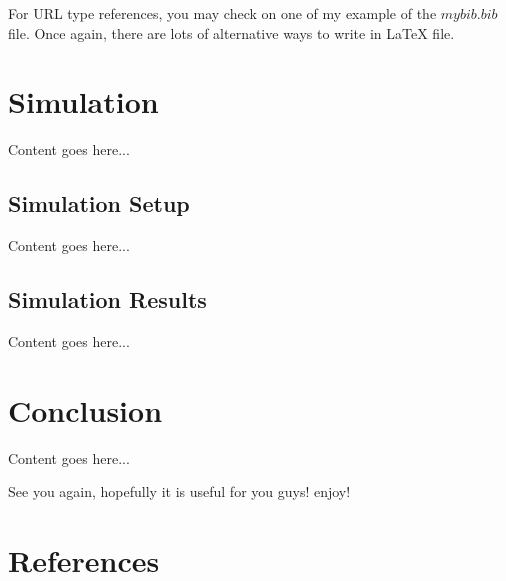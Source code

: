 \documentclass[preprint]{elsarticle}
\begin{document}
For URL type references, you may check on one of my example of the $mybib.bib$ file. Once again, there are lots of alternative ways to write in LaTeX file. 

\section{Simulation}
Content goes here... 

\subsection{Simulation Setup}
Content goes here... 

\subsection{Simulation Results}
Content goes here... 

\section{Conclusion}
Content goes here... 

See you again, hopefully it is useful for you guys! enjoy!

\section*{References}

\end{document}
